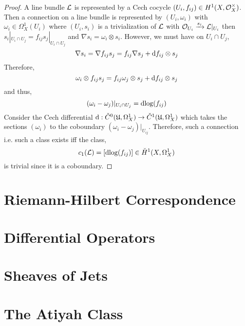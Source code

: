 \documentclass[12pt]{article}
\renewcommand{\U}{\mathfrak{U}}
\begin{document}
\begin{proof}
A line bundle $\mathcal{L}$ is represented by a Cech cocycle $(U_i, f_{ij}) \in H^1(X, \mathcal{O}_{X}^\times)$. Then a connection on a line bundle is represented by $(U_i, \omega_i)$ with $\omega_i \in \Omega^1_X(U_i)$ where $(U_i, s_i)$ is a trivialization of $\mathcal{L}$ with $\mathcal{O}_{U_i} \xrightarrow{s_i} \mathcal{L}|_{U_i}$ then $s_i |_{U_i \cap U_j} = f_{ij} s_j |_{U_i \cap U_j}$ and $\nabla s_i = \omega_i \otimes s_i$. However, we must have on $U_i \cap U_j$,
\[ \nabla s_i = \nabla f_{ij} s_j = f_{ij} \nabla s_j + \mathrm{d}{f_{ij}} \otimes s_j \]
Therefore,
\[ \omega_i \otimes f_{ij} s_j = f_{ij} \omega_j \otimes s_j + \mathrm{d}{f_{ij}} \otimes s_j \]
and thus,
\[ (\omega_i - \omega_j)|_{U_i \cap U_j} = \mathrm{d}{\log}(f_{ij}) \]
Consider the Cech differential $\d : \check{C}^0(\U, \Omega^1_X) \to \check{C}^1(\U, \Omega^1_X)$ which takes the sections $(\omega_i)$ to the coboundary $(\omega_i - \omega_j)|_{U_{ij}}$. Therefore, such a connection i.e. such a class exists iff the class,
\[ c_1(\mathcal{L}) = [\mathrm{d}{\log}(f_{ij})] \in \check{H}^1(X, \Omega^1_X) \]
is trivial since it is a coboundary. 
\end{proof}

\section{Riemann-Hilbert Correspondence}

\section{Differential Operators}

\section{Sheaves of Jets}

\section{The Atiyah Class}
\end{document}
